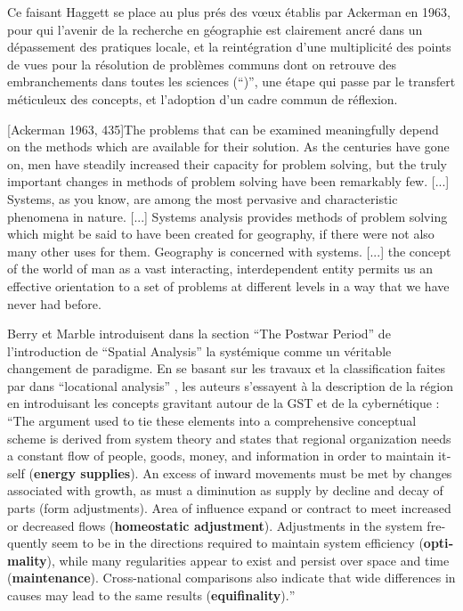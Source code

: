{Ce faisant Haggett se place au plus prés des vœux établis par Ackerman en 1963, pour qui l'avenir de la recherche en géographie est clairement ancré dans un dépassement des pratiques locale, et la reintégration d'une multiplicité des points de vues pour la résolution de problèmes communs dont on retrouve des embranchements dans toutes les sciences (\foreignquote{overriding problems}), une étape qui passe par le transfert méticuleux des concepts, et l'adoption d'un cadre commun de réflexion.

[Ackerman 1963, 435]{The problems that can be examined meaningfully depend on the methods which are available for their solution. As the centuries have gone on, men have steadily increased their capacity for problem solving, but the truly important changes in methods of problem solving have been remarkably few. [...] Systems, as you know, are among the most pervasive and characteristic phenomena in nature. [...] Systems analysis provides methods of problem solving which might be said to have been created for geography, if there were not also many other uses for them. Geography is concerned with systems. [...] the concept of the world of man as a vast interacting, interdependent entity permits us an effective orientation to a set of problems at different levels in a way that we have never had before.}

Berry et Marble introduisent dans la section \foreignquote{english}{The Postwar Period} de l'introduction de \foreignquote{english}{Spatial Analysis} la systémique comme un véritable changement de paradigme. En se basant sur les travaux et la classification faites par \textcite{Haggett1965} dans \foreignquote{english}{locational analysis} , les auteurs s'essayent à la description de la région en introduisant les concepts gravitant autour de la GST et de la cybernétique : \foreignquote{english}{The argument used to tie these elements into a comprehensive conceptual scheme is derived from system theory and states that regional organization needs a constant flow of people, goods, money, and information in order to maintain itself (\textbf{energy supplies}). An excess of inward movements must be met by changes associated with growth, as must a diminution as supply by decline and decay of parts (form adjustments). Area of influence expand or contract to meet increased or decreased flows (\textbf{homeostatic adjustment}). Adjustments in the system frequently seem to be in the directions required to maintain system efficiency (\textbf{optimality}), while many regularities appear to exist and persist over space and time (\textbf{maintenance}). Cross-national comparisons also indicate that wide differences in causes may lead to the same results (\textbf{equifinality}).}

}
